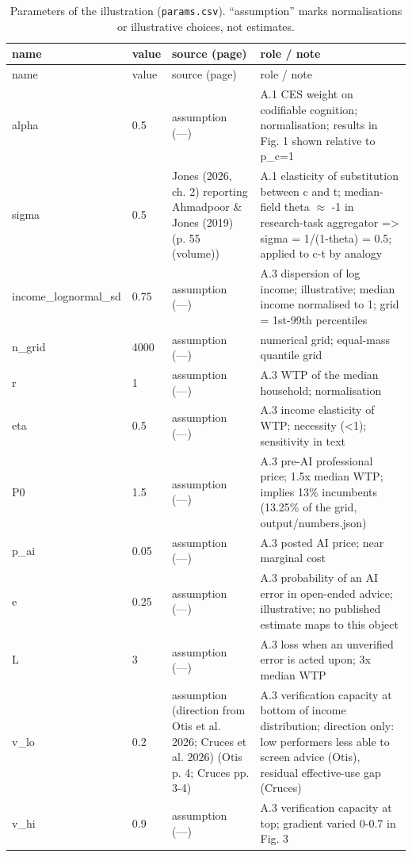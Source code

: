 \small\begin{longtable}{p{}p{}p{}p{}}
\caption{Parameters of the illustration (\texttt{params.csv}). ``assumption'' marks normalisations or illustrative choices, not estimates.}\label{tab:params}\\
\toprule name & value & source (page) & role / note\\ \midrule\endfirsthead\toprule name & value & source (page) & role / note\\ \midrule\endhead
alpha & 0.5 & assumption (—) & A.1 CES weight on codifiable cognition; normalisation; results in Fig. 1 shown relative to p\_c=1\\
sigma & 0.5 & Jones (2026, ch. 2) reporting Ahmadpoor \& Jones (2019) (p. 55 (volume)) & A.1 elasticity of substitution between c and t; median-field theta $\approx$ -1 in research-task aggregator => sigma = 1/(1-theta) = 0.5; applied to c-t by analogy\\
income\_lognormal\_sd & 0.75 & assumption (—) & A.3 dispersion of log income; illustrative; median income normalised to 1; grid = 1st-99th percentiles\\
n\_grid & 4000 & assumption (—) & numerical grid; equal-mass quantile grid\\
r & 1 & assumption (—) & A.3 WTP of the median household; normalisation\\
eta & 0.5 & assumption (—) & A.3 income elasticity of WTP; necessity (<1); sensitivity in text\\
P0 & 1.5 & assumption (—) & A.3 pre-AI professional price; 1.5x median WTP; implies 13\% incumbents (13.25\% of the grid, output/numbers.json)\\
p\_ai & 0.05 & assumption (—) & A.3 posted AI price; near marginal cost\\
e & 0.25 & assumption (—) & A.3 probability of an AI error in open-ended advice; illustrative; no published estimate maps to this object\\
L & 3 & assumption (—) & A.3 loss when an unverified error is acted upon; 3x median WTP\\
v\_lo & 0.2 & assumption (direction from Otis et al. 2026; Cruces et al. 2026) (Otis p. 4; Cruces pp. 3-4) & A.3 verification capacity at bottom of income distribution; direction only: low performers less able to screen advice (Otis), residual effective-use gap (Cruces)\\
v\_hi & 0.9 & assumption (—) & A.3 verification capacity at top; gradient varied 0-0.7 in Fig. 3\\

\end{longtable}
